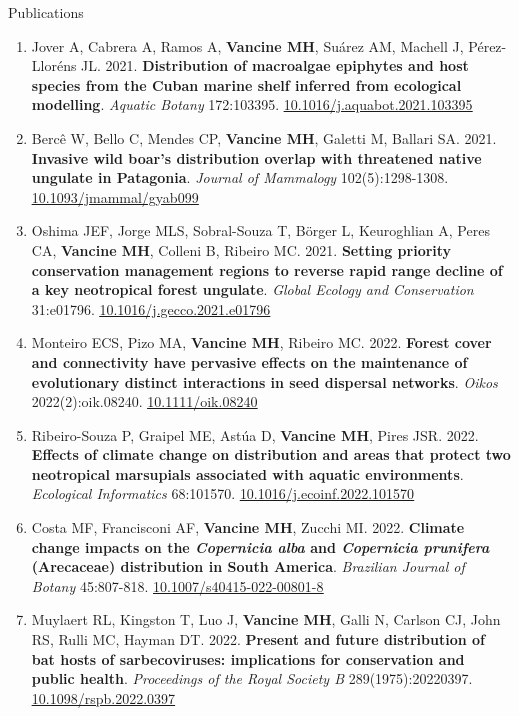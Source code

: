 \documentclass{resume}
\begin{document}
\begin{rSection}{Publications}
\begin{enumerate}
\item Jover A, Cabrera A, Ramos A, {\bf Vancine MH}, Suárez AM, Machell J, Pérez-Lloréns JL. 2021. {\bf Distribution of macroalgae epiphytes and host species from the Cuban marine shelf inferred from ecological modelling}. {\it Aquatic Botany} 172:103395. \href{https://doi.org/10.1016/j.aquabot.2021.103395}{\underline{10.1016/j.aquabot.2021.103395}}

\item Bercê W, Bello C, Mendes CP, {\bf Vancine MH}, Galetti M, Ballari SA. 2021. {\bf Invasive wild boar’s distribution overlap with threatened native ungulate in Patagonia}. {\it Journal of Mammalogy} 102(5):1298-1308. \href{https://doi.org/10.1093/jmammal/gyab099}{\underline{10.1093/jmammal/gyab099}}

\item Oshima JEF, Jorge MLS, Sobral-Souza T, Börger L, Keuroghlian A, Peres CA, {\bf Vancine MH}, Colleni B, Ribeiro MC. 2021. {\bf Setting priority conservation management regions to reverse rapid range decline of a key neotropical forest ungulate}. {\it Global Ecology and Conservation} 31:e01796. \href{https://doi.org/10.1016/j.gecco.2021.e01796}{\underline{10.1016/j.gecco.2021.e01796}}

\item Monteiro ECS, Pizo MA, {\bf Vancine MH}, Ribeiro MC. 2022. {\bf Forest cover and connectivity have pervasive effects on the maintenance of evolutionary distinct interactions in seed dispersal networks}. {\it Oikos} 2022(2):oik.08240. \href{https://doi.org/10.1111/oik.08240}{\underline{10.1111/oik.08240}}

\item Ribeiro-Souza P, Graipel ME, Astúa D, {\bf Vancine MH}, Pires JSR. 2022. {\bf Effects of climate change on distribution and areas that protect two neotropical marsupials associated with aquatic environments}. {\it Ecological Informatics} 68:101570. \href{https://doi.org/10.1016/j.ecoinf.2022.101570}{\underline{10.1016/j.ecoinf.2022.101570}}

\item Costa MF, Francisconi AF, {\bf Vancine MH}, Zucchi MI. 2022. {\bf Climate change impacts on the \textbf{\textit{ Copernicia alba}} and \textbf{\textit{Copernicia prunifera}} (Arecaceae) distribution in South America}. {\it Brazilian Journal of Botany} 45:807-818. \href{https://doi.org/10.1007/s40415-022-00801-8}{\underline{10.1007/s40415-022-00801-8}}

\item Muylaert RL, Kingston T, Luo J, {\bf Vancine MH}, Galli N, Carlson CJ, John RS, Rulli MC, Hayman DT. 2022. {\bf Present and future distribution of bat hosts of sarbecoviruses: implications for conservation and public health}. {\it Proceedings of the Royal Society B} 289(1975):20220397. \href{https://doi.org/10.1098/rspb.2022.0397}{\underline{10.1098/rspb.2022.0397}}


\end{enumerate}
\end{rSection}
\end{document}
